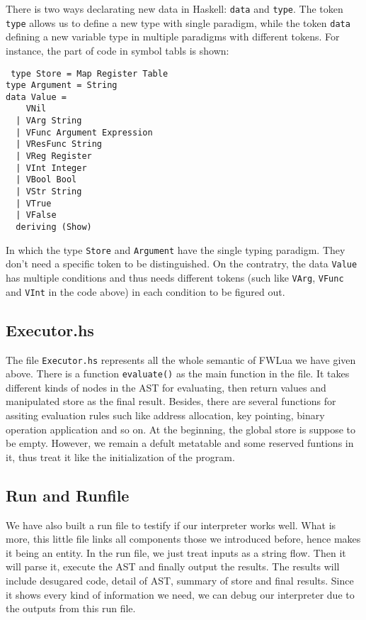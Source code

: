 \documentclass{article}
\begin{document}
There is two ways declarating new data in Haskell: {\tt data} and {\tt type}. The token {\tt type} allows us to define a new type with single paradigm, while the token {\tt data} defining a new variable type in multiple paradigms with different tokens. For instance, the part of code in symbol tabls is shown:
\begin{flushleft}
{\tt 
type Store = Map Register Table\\
type Argument = String\\
data Value = \\
~~~~VNil\\
~~| VArg String\\
~~| VFunc Argument Expression\\
~~| VResFunc String\\
~~| VReg Register\\
~~| VInt Integer\\
~~| VBool Bool\\
~~| VStr String\\
~~| VTrue\\
~~| VFalse\\
~~deriving (Show)\\
}
\end{flushleft}
In which the type {\tt Store} and {\tt Argument} have the single typing paradigm. They don't need a specific token to be distinguished. On the contratry, the data {\tt Value} has multiple conditions and thus needs different tokens (such like {\tt VArg}, {\tt VFunc} and {\tt VInt} in the code above) in each condition to be figured out.

\subsection{Executor.hs}
The file {\tt Executor.hs} represents all the whole semantic of FWLua we have given above. There is a function {\tt evaluate()} as the main function in the file. It takes different kinds of nodes in the AST for evaluating, then return values and manipulated store as the final result. Besides, there are several functions for assiting evaluation rules such like address allocation, key pointing, binary operation application and so on. At the beginning, the global store is suppose to be empty. However, we remain a defult metatable and some reserved funtions in it, thus treat it like the initialization of the program.

\subsection{Run and Runfile}
We have also built a run file to testify if our interpreter works well. What is more, this little file links all components those we introduced before, hence makes it being an entity. In the run file, we just treat inputs as a string flow. Then it will parse it, execute the AST and finally output the results. The results will include desugared code, detail of AST, summary of store and final results. Since it shows every kind of information we need, we can debug our interpreter due to the outputs from this run file.
\end{document}
